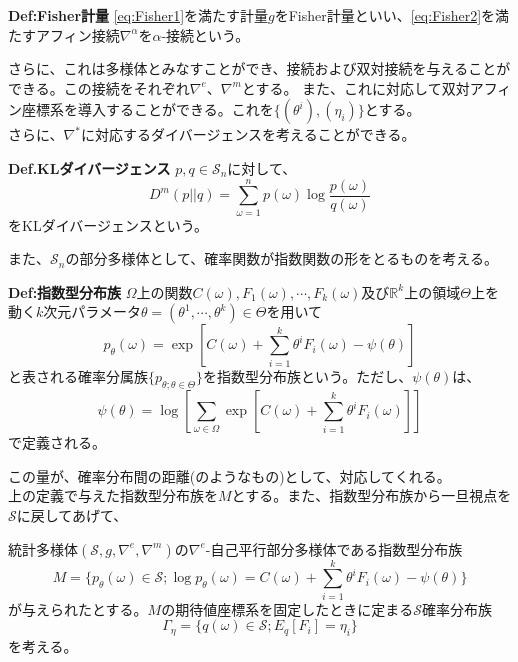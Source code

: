 \documentclass[a4paper,11pt]{jsarticle}
\numberwithin{equation}{section}
\begin{document}
\begin{itembox}[l]{\textbf{Def:Fisher計量}}
    \ref{eq:Fisher1}を満たす計量$g$をFisher計量といい、\ref{eq:Fisher2}を満たすアフィン接続$\nabla^{\alpha}$を$\alpha$-接続という。

さらに、これは多様体とみなすことができ、接続および双対接続を与えることができる。この接続をそれぞれ$\nabla^{e}$、$\nabla^{m}$とする。
また、これに対応して双対アフィン座標系を導入することができる。これを$\{(\theta^i),(\eta_i)\}$とする。\\
さらに、$\nabla^*$に対応するダイバージェンスを考えることができる。

\begin{itembox}[l]{\textbf{Def.KLダイバージェンス}}
    $p,q \in \mathcal{S}_n$に対して、
    \begin{equation}
        D^m(p||q) = \sum_{\omega=1}^{n} p(\omega) \log \frac{p(\omega)}{q(\omega)}
    \end{equation}
    をKLダイバージェンスという。
\end{itembox}

また、$\mathcal{S}_n$の部分多様体として、確率関数が指数関数の形をとるものを考える。
\begin{itembox}[l]{\textbf{Def:指数型分布族}}
    $\Omega$上の関数$C(\omega),F_1(\omega),\cdots,F_k(\omega)$及び$\mathbb{R}^k$上の領域$\Theta$上を動く$k$次元パラメータ$\theta = (\theta^1,\cdots,\theta^k) \in \Theta$を用いて
    \begin{equation}
        p_{\theta}(\omega) = \exp\left[ C(\omega) + \sum_{i=1}^{k} \theta^i F_i(\omega) - \psi(\theta) \right]
    \end{equation}
    と表される確率分属族$\{p_{\theta;\theta \in \Theta}\}$を指数型分布族という。ただし、$\psi(\theta)$は、
    \begin{equation}
        \psi(\theta) = \log \left[ \sum_{\omega \in \Omega} \exp\left[ C(\omega) + \sum_{i=1}^{k} \theta^i F_i(\omega) \right] \right]
    \end{equation}
    で定義される。  
\end{itembox}
この量が、確率分布間の距離(のようなもの)として、対応してくれる。\\

上の定義で与えた指数型分布族を$M$とする。また、指数型分布族から一旦視点を$\mathcal{S}$に戻してあげて、

統計多様体$(\mathcal{S},g,\nabla^{e},\nabla^{m})$の$\nabla^{e}$-自己平行部分多様体である指数型分布族
\begin{equation}
    M = \{p_{\theta}(\omega) \in \mathcal{S}; \log p_{\theta}(\omega) = C(\omega) + \sum_{i=1}^{k} \theta^i F_i(\omega) - \psi(\theta) \}
\end{equation}
が与えられたとする。$M$の期待値座標系を固定したときに定まる$\mathcal{S}$確率分布族
\begin{equation}
    \Gamma_{\eta} = \{q(\omega) \in \mathcal{S}; E_q [F_i] = \eta_i \}
\end{equation}
を考える。


\end{itembox}
\end{document}
